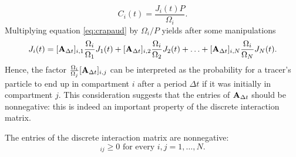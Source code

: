 \begin{equation}
	C_i(t) = \frac{J_i(t) P}{\Omega_i}.
\end{equation}
Multiplying equation \eqref{eq:crapaud} by $\Omega_i/P$ yields after some manipulations
\begin{equation}
	J_i(t) = [\mathbf A_{\Delta t}]_{i,1} \frac{\Omega_i}{\Omega_1} J_{1}(t) + [\mathbf A_{\Delta t}]_{i,2}\frac{\Omega_i}{\Omega_2} J_{2}(t) + \ldots + [\mathbf A_{\Delta t}]_{i,N}\frac{\Omega_i}{\Omega_N} J_{N}(t).
\end{equation}
Hence, the factor $\frac{\Omega_i}{\Omega_j}[\mathbf A_{\Delta t}]_{i,j}$ can be interpreted as the probability \label{page:probability_interpretation} for a tracer's particle to end up in compartment $i$ after a period $\Delta t$ if it was initially in compartment $j$. This consideration suggests that the entries of $\mathbf A_{\Delta t}$ should be nonnegative: this is indeed an important property of the discrete interaction matrix.
\begin{property} \label{prop1_discr_comp}
	The entries of the discrete interaction matrix are nonnegative:
	\begin{equation}
		[\b A_{\Delta t}]_{ij} \ge 0 \mbox{ for every } i,j = 1,\dots,N.
	\end{equation}
\end{property}
